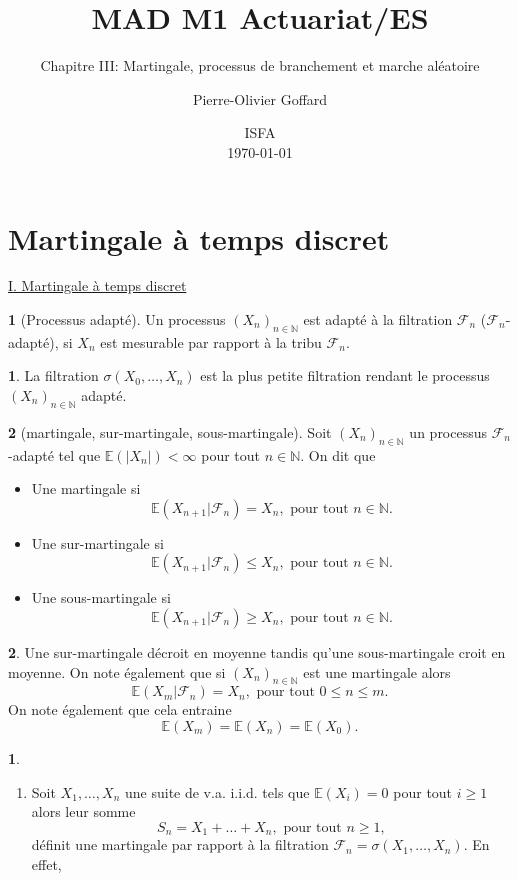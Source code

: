\documentclass[8pt,notheorems]{beamer}
\title[]{MAD M1 Actuariat/ES}
\subtitle{Chapitre III: Martingale, processus de branchement et marche aléatoire}
\author{Pierre-Olivier Goffard}
\institute{
	   Université de Lyon 1\\
	ISFA\\
	   \texttt{pierre-olivier.goffard@univ-lyon1.fr}
	  }
\date{
ISFA\\
\today}
\def \E{\mathbb E}
\def \N{\mathbb N}
\newcommand{\F}{\mathcal{F}}
\theoremstyle{definition}
\newtheorem{definition}{\translate{Definition}}
\theoremstyle{example}
\newtheorem{example}{\translate{Exemple}}
\newtheorem{remark}{\translate{Remarque}}
\theoremstyle{mystyle}
\theoremstyle{plain}
\begin{document}
\frame{\titlepage}


\section{Martingale à temps discret}
\begin{frame}[allowframebreaks]
\underline{I. Martingale à temps discret}\\
\begin{definition}[Processus adapté]
Un processus $(X_n)_{n\in \N}$ est adapté à la filtration $\mathcal{F}_n$ ($\mathcal{F}_n$-adapté), si $X_n$ est mesurable par rapport à la tribu $\mathcal{F}_n$.
\end{definition}
\begin{remark}
La filtration $\sigma(X_0,\ldots,X_n)$ est la plus petite filtration rendant le processus $(X_n)_{n\in \N}$ adapté.
\end{remark}
\begin{definition}[martingale, sur-martingale, sous-martingale]
Soit $(X_n)_{n\in \N}$ un processus $\mathcal{F}_n$-adapté tel que $\E(|X_n|)<\infty$ pour tout $n\in \N$. On dit que
\begin{itemize}
    \item Une martingale si
    $$
    \E(X_{n+1}|\mathcal{F}_n) = X_n,\text{ pour tout } n\in \N.
    $$
    \item Une sur-martingale si
    $$
    \E(X_{n+1}|\mathcal{F}_n) \leq X_n,\text{ pour tout } n\in \N.
    $$
    \item Une sous-martingale si
    $$
    \E(X_{n+1}|\mathcal{F}_n) \geq X_n,\text{ pour tout } n\in \N.
    $$
\end{itemize}
\end{definition}
\begin{remark}
Une sur-martingale décroit en moyenne tandis qu'une sous-martingale croit en moyenne. On note également que si $(X_n)_{n\in \N}$ est une martingale alors
$$
\E(X_m|\F_n) = X_n,\text{ pour tout }0\leq n\leq m.
$$
On note également que cela entraine
$$
\E(X_m)=\E(X_n)=\E(X_0).
$$
\end{remark}
\begin{example}
\begin{enumerate}
    \item Soit $X_1,\ldots, X_n$ une suite de v.a. i.i.d. tels que $\E(X_i) = 0$ pour tout $i\geq 1$ alors leur somme
    $$
    S_n = X_1+\ldots+X_n,\text{ pour tout }n\geq1,
    $$
    définit une martingale par rapport à la filtration $\mathcal{F}_n = \sigma(X_1,\ldots, X_n)$. En effet,

\end{enumerate}
\end{example}
\end{frame}
\end{document}
